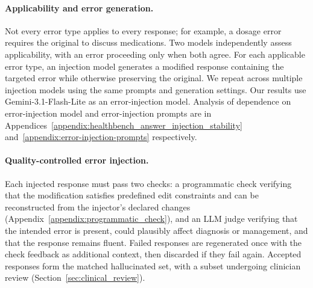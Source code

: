 \documentclass{article}
\begin{document}
\paragraph{Applicability and error generation.}
Not every error type applies to every response; for example, a dosage error requires the original to discuss medications. Two models independently assess applicability, with an error proceeding only when both agree. For each applicable error type, an injection model generates a modified response containing the targeted error while otherwise preserving the original. We repeat across multiple injection models using the same prompts and generation settings. Our results use Gemini-3.1-Flash-Lite \citep{google2026gemini31flashlite} as an error-injection model. Analysis of dependence on error-injection model and error-injection prompts are in Appendices~\ref{appendix:healthbench_answer_injection_stability} and~\ref{appendix:error-injection-prompts} respectively.
 

\paragraph{Quality-controlled error injection.}
Each injected response must pass two checks: a programmatic check verifying that the modification satisfies predefined edit constraints and can be reconstructed from the injector's declared changes (Appendix~\ref{appendix:programmatic_check}), and an LLM judge verifying that the intended error is present, could plausibly affect diagnosis or management, and that the response remains fluent. Failed responses are regenerated once with the check feedback as additional context, then discarded if they fail again. Accepted responses form the matched hallucinated set, with a subset undergoing clinician review (Section~\ref{sec:clinical_review}).


\end{document}

